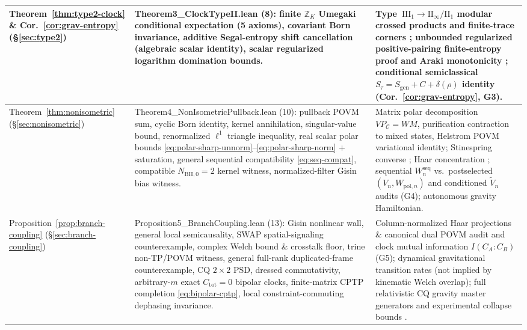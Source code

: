 \documentclass[11pt,a4paper]{article}
\theoremstyle{definition}
\theoremstyle{remark}
\newcommand{\cC}{\mathcal{C}}
\newcommand{\bbZ}{\mathbb{Z}}
\newcommand{\1}{\mathbf{1}}
\newcommand{\code}[1]{{\scriptsize\ttfamily #1}}
\begin{document}
\begin{table}[!tb]
\begin{tabular}{@{} >{\raggedright\arraybackslash}p{2.3cm} >{\raggedright\arraybackslash}p{6.2cm} >{\raggedright\arraybackslash}p{6.2cm} @{}}
\midrule
Theorem~\ref{thm:type2-clock} \& Cor.~\ref{cor:grav-entropy} (\S\ref{sec:type2}) &
\code{Theorem3\_ClockTypeII.lean} (8): finite $\bbZ_K$ Umegaki conditional expectation (5 axioms), covariant Born invariance, additive Segal-entropy shift cancellation (algebraic scalar identity), scalar regularized logarithm domination bounds. &
Type~$\mathrm{III}_1\to\mathrm{II}_\infty/\mathrm{II}_1$ modular crossed products and finite-trace corners \cite{Takesaki1973,Witten2022,JensenSorceSperanza2023}; unbounded regularized positive-pairing finite-entropy proof and Araki monotonicity \cite{Araki1977}; conditional semiclassical $S_\tau=S_{\mathrm{gen}}+C+\delta(\rho)$ identity (Cor.~\ref{cor:grav-entropy}, G3). \\
\midrule
Theorem~\ref{thm:nonisometric} (\S\ref{sec:nonisometric}) &
\code{Theorem4\_NonIsometricPullback.lean} (10): pullback POVM sum, cyclic Born identity, kernel annihilation, singular-value bound, renormalized $\ell^1$ triangle inequality, real scalar polar bounds \eqref{eq:polar-sharp-unnorm}--\eqref{eq:polar-sharp-norm} + saturation, general sequential compatibility \eqref{eq:seq-compat}, compatible $N_{\mathrm{BH},0}=2$ kernel witness, normalized-filter Gisin bias witness. &
Matrix polar decomposition $VP_\cC=WM$, purification contraction to mixed states, Helstrom POVM variational identity; Stinespring converse \cite{Watrous2018}; Haar concentration \cite{Akers2024}; sequential $W_n^{\mathrm{seq}}$ vs.\ postselected $(V_n,W_{\mathrm{pol},n})$ and conditioned $\tilde{V}_n$ audits \cite{Chiribella2009,DeWolfeHigginbotham2023} (G4); autonomous gravity Hamiltonian. \\
\midrule
Proposition~\ref{prop:branch-coupling} (\S\ref{sec:branch-coupling}) &
\code{Proposition5\_BranchCoupling.lean} (13): Gisin nonlinear wall, general local semicausality, SWAP spatial-signaling counterexample, complex Welch bound \& crosstalk floor, trine non-TP/POVM witness, general full-rank duplicated-frame counterexample, CQ $2\times 2$ PSD, dressed commutativity, arbitrary-$m$ exact $C_{\mathrm{tot}}=0$ bipolar clocks, finite-matrix CPTP completion \eqref{eq:bipolar-cptp}, local constraint-commuting dephasing invariance. &
Column-normalized Haar projections \& canonical dual POVM audit and clock mutual information $I(C_A:C_B)$ (G5); dynamical gravitational transition rates (not implied by kinematic Welch overlap); full relativistic CQ gravity master generators \cite{Oppenheim2023PRX} and experimental collapse bounds \cite{Donadi2021}. \\
\bottomrule
\end{tabular}
\end{table}
\end{document}
